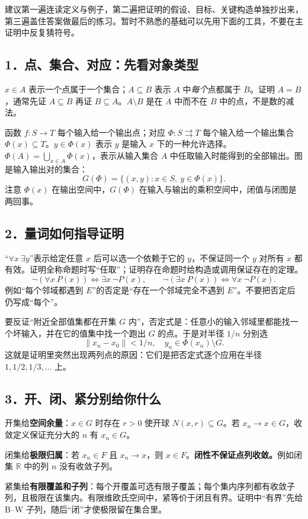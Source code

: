 \documentclass[11pt,a4paper]{article}
\newcommand{\R}{\mathbb{R}}\newcommand{\N}{\mathbb{N}}
\theoremstyle{definition}\newtheorem{definition}{定义}\newtheorem{example}{例}
\begin{document}
建议第一遍连读定义与例子，第二遍把证明的假设、目标、关键构造单独抄出来，第三遍盖住答案做最后的练习。暂时不熟悉的基础可以先用下面的工具，不要在主证明中反复猜符号。

\subsection*{1．点、集合、对应：先看对象类型}
$x\in A$ 表示一个点属于一个集合；$A\subseteq B$ 表示 $A$ 中\emph{每个}点都属于 $B$。证明 $A=B$，通常先证 $A\subseteq B$ 再证 $B\subseteq A$。$A\setminus B$ 是在 $A$ 中而不在 $B$ 中的点，不是数的减法。

函数 $f:S\to T$ 每个输入给一个输出点；对应 $\Phi:S\rightrightarrows T$ 每个输入给一个输出集合 $\Phi(x)\subseteq T$。$y\in\Phi(x)$ 表示 $y$ 是输入 $x$ 下的一种允许选择。$\Phi(A)=\bigcup_{x\in A}\Phi(x)$，表示从输入集合 $A$ 中任取输入时能得到的全部输出。图是输入输出对的集合：
\[G(\Phi)=\{(x,y):x\in S,\ y\in\Phi(x)\}.\]
注意 $\Phi(x)$ 在输出空间中，$G(\Phi)$ 在输入与输出的乘积空间中，闭值与闭图是两回事。

\subsection*{2．量词如何指导证明}
“$\forall x\ \exists y$”表示给定任意 $x$ 后可以选一个依赖于它的 $y$，不保证同一个 $y$ 对所有 $x$ 都有效。证明全称命题时写“任取”；证明存在命题时给构造或调用保证存在的定理。
\[\neg(\forall x\ P(x))\iff\exists x\ \neg P(x),\qquad
\neg(\exists x\ P(x))\iff\forall x\ \neg P(x).\]
例如“每个邻域都遇到 $E$”的否定是“存在一个邻域完全不遇到 $E$”。不要把否定后仍写成“每个”。

要反证“附近全部值集都在开集 $G$ 内”，否定式是：任意小的输入邻域里都能找一个坏输入，并在它的值集中找一个跑出 $G$ 的点。于是对半径 $1/n$ 分别选
\[\|x_n-x_0\|<1/n,\quad y_n\in\Phi(x_n)\setminus G.\]
这就是证明里突然出现两列点的原因：它们是把否定式逐个应用在半径 $1,1/2,1/3,\ldots$ 上。

\subsection*{3．开、闭、紧分别给你什么}
开集给\textbf{空间余量}：$x\in G$ 时存在 $r>0$ 使开球 $N(x,r)\subseteq G$。若 $x_n\to x\in G$，收敛定义保证充分大的 $n$ 有 $x_n\in G$。

闭集给\textbf{极限归属}：若 $x_n\in F$ 且 $x_n\to x$，则 $x\in F$。\textbf{闭性不保证点列收敛。}例如闭集 $\R$ 中的列 $n$ 没有收敛子列。

紧集给\textbf{有限覆盖和子列}：每个开覆盖可选有限子覆盖；每个集内序列都有收敛子列，且极限在该集内。有限维欧氏空间中，紧等价于闭且有界。证明中“有界”先给 B--W 子列，随后“闭”才使极限留在集合里。
\end{document}
